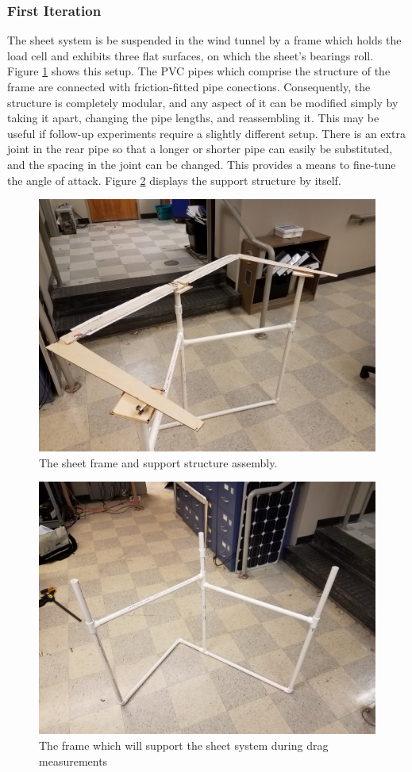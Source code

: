 \documentclass[12pt]{report} %
\begin{document}
\subsubsection{First Iteration}
The sheet system is be suspended in the wind tunnel by a frame which holds the load cell and exhibits three flat surfaces, on which the
sheet's bearings roll. Figure \ref{frame_and_support} shows this setup.
The PVC pipes which comprise the structure of the frame are connected with friction-fitted pipe conections.
Consequently, the structure is completely modular, and any aspect of it can be modified simply by taking it apart, changing the pipe lengths,
and reassembling it. This may be useful if follow-up experiments require a slightly different setup. There is an extra joint in the rear pipe
so that a longer or shorter pipe can easily be substituted, and the spacing in the joint can be changed. This provides a means to
fine-tune the angle of attack. Figure \ref{support_structure} displays
the support structure by itself.

\begin{figure}
\includegraphics[width = 0.7\linewidth]{drag_setup.jpg}
\centering
\caption{The sheet frame and support structure assembly.}
\label{frame_and_support}
\end{figure}

\begin{figure}
\includegraphics[width = 0.7\linewidth]{mount_structure.jpg}
\centering
\caption{The frame which will support the sheet system during drag measurements}
\label{support_structure}
\end{figure}
\end{document}
